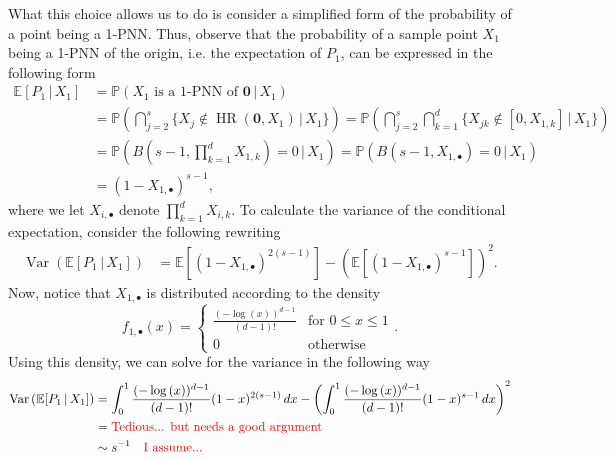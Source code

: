 \documentclass[letterpaper,10pt]{article}
\numberwithin{equation}{section}
\numberwithin{thm}{section}
\numberwithin{lem}{section}
\numberwithin{cor}{section}
\newcommand{\1}{\mathbb{1}}
\begin{document}
What this choice allows us to do is consider a simplified form of the probability of a point being a 1-PNN.
Thus, observe that the probability of a sample point $X_1$ being a 1-PNN of the origin, i.e. the expectation of $P_1$, can be expressed in the following form
\begin{equation*}
	\begin{aligned}
		\mathbb{E}[P_1 \, | \, X_1]
		 & = \mathbb{P}(X_1 \text{ is a 1-PNN of } \mathbf{0} \, | \, X_1)                                            \\
		 & = \mathbb{P}\left(\bigcap_{j = 2}^{s} \{X_j \not\in \operatorname{HR}(\mathbf{0}, X_1)\, | \, X_1\}\right)
		= \mathbb{P}\left(\bigcap_{j = 2}^{s}\bigcap_{k = 1}^{d} \{X_{jk} \not\in [0, X_{1,k}]\, | \, X_1\}\right)    \\
		 & = \mathbb{P}\left(B\left(s - 1, \prod_{k = 1}^{d} X_{1,k}\right) = 0\, | \, X_1\right)
		= \mathbb{P}\left(B\left(s - 1, X_{1, \bullet}\right) = 0\, | \, X_1\right)                                   \\
		 & = (1-X_{1, \bullet})^{s-1},
	\end{aligned}
\end{equation*}
where we let $X_{i,\bullet}$ denote $\prod_{k = 1}^{d} X_{i,k}$.
To calculate the variance of the conditional expectation, consider the following rewriting
\begin{equation*}
	\begin{aligned}
		\operatorname{Var}\left(\mathbb{E}[P_1 \, | \, X_1]\right)
		 & = \mathbb{E}[(1-X_{1, \bullet})^{2(s-1)}] - \left(\mathbb{E}[(1-X_{1, \bullet})^{s-1}]\right)^2.
	\end{aligned}
\end{equation*}
Now, notice that $X_{1,\bullet}$ is distributed according to the density
\begin{equation*}
	f_{1, \bullet}(x) = \begin{cases}
		\frac{(-\log{(x)})^{d-1}}{(d-1)!} & \text{for } 0\leq x \leq 1 \\
		0                                 & \text{otherwise}
	\end{cases}.
\end{equation*}
Using this density, we can solve for the variance in the following way
\begin{equation*}
	\begin{aligned}
		\operatorname{Var}\left(\mathbb{E}[P_1 \, | \, X_1]\right)
		 & = \int_{0}^{1} \frac{(-\log{(x)})^{d-1}}{(d-1)!} (1-x)^{2(s-1)} \, dx - \left(\int_{0}^{1} \frac{(-\log{(x)})^{d-1}}{(d-1)!}(1-x)^{s-1} \, dx\right)^2 \\
		 & = {\color{red}\text{Tedious... but needs a good argument}}                                                                                             \\
		 & \sim s^{-1} \quad {\color{red} \text{I assume...}}
	\end{aligned}
\end{equation*}
\end{document}
